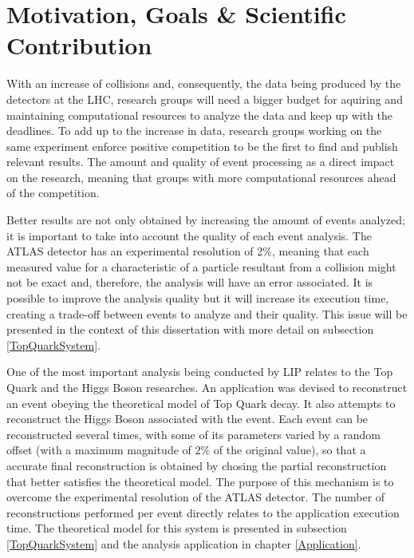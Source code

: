 \section{Motivation, Goals \& Scientific Contribution}
\label{Motivation}

With an increase of collisions and, consequently, the data being produced by the detectors at the LHC, research groups will need a bigger budget for aquiring and maintaining computational resources to analyze the data and keep up with the deadlines. To add up to the increase in data, research groups working on the same experiment enforce positive competition to be the first to find and publish relevant results. The amount and quality of event processing as a direct impact on the research, meaning that groups with more computational resources ahead of the competition.

Better results are not only obtained by increasing the amount of events analyzed; it is important to take into account the quality of each event analysis. The ATLAS detector has an experimental resolution of 2\%, meaning that each measured value for a characteristic of a particle resultant from a collision might not be exact and, therefore, the analysis will have an error associated. It is possible to improve the analysis quality but it will increase its execution time, creating a trade-off between events to analyze and their quality. This issue will be presented in the context of this dissertation with more detail on subsection \ref{TopQuarkSystem}.

One of the most important analysis being conducted by LIP relates to the Top Quark and the Higgs Boson researches. An application was devised to reconstruct an event obeying the theoretical model of Top Quark decay. It also attempts to reconstruct the Higgs Boson associated with the event. Each event can be reconstructed several times, with some of its parameters varied by a random offset (with a maximum magnitude of 2\% of the original value), so that a accurate final reconstruction is obtained by chosing the partial reconstruction that better satisfies the theoretical model. The purpose of this mechanism is to overcome the experimental resolution of the ATLAS detector. The number of reconstructions performed per event directly relates to the application execution time. The theoretical model for this system is presented in subsection \ref{TopQuarkSystem} and the analysis application in chapter \ref{Application}.

